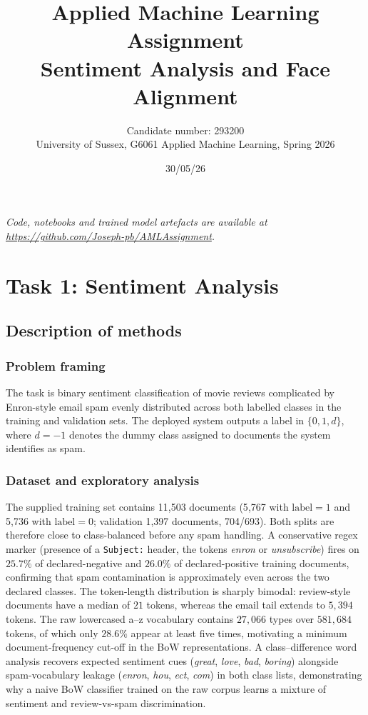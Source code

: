 \documentclass[11pt,a4paper]{article}
\title{%
 Applied Machine Learning Assignment\\[0.4em]
 \large Sentiment Analysis and Face Alignment%
}
\author{%
 Candidate number: 293200\\
 \small University of Sussex, G6061 Applied Machine Learning, Spring 2026%
}
\date{30/05/26}
\begin{document}
\maketitle

\noindent\textit{Code, notebooks and trained model artefacts are available
at \url{https://github.com/Joseph-pb/AMLAssignment}.}


\section{Task 1: Sentiment Analysis}


%

\subsection{Description of methods}
%


\subsubsection{Problem framing}

The task is binary sentiment classification of movie reviews complicated
by Enron-style email spam evenly distributed across both labelled
classes in the training and validation sets. The deployed system outputs
a label in \(\{0, 1, d\}\), where \(d=-1\) denotes the dummy class
assigned to documents the system identifies as spam.

\subsubsection{Dataset and exploratory analysis}

The supplied training set contains 11{,}503 documents (5{,}767 with
\(\textrm{label}=1\) and 5{,}736 with \(\textrm{label}=0\); validation
1{,}397 documents, 704/693). Both splits are therefore close to
class-balanced before any spam handling. A conservative regex marker
(presence of a \texttt{Subject:} header, the tokens \emph{enron} or
\emph{unsubscribe}) fires on \(25.7\%\) of declared-negative and
\(26.0\%\) of declared-positive training documents, confirming that spam
contamination is approximately even across the two declared classes.
The token-length distribution is sharply bimodal: review-style documents
have a median of \(21\) tokens, whereas the email tail extends to
\(5{,}394\) tokens. The raw lowercased a--z vocabulary contains
\(27{,}066\) types over \(581{,}684\) tokens, of which only \(28.6\%\)
appear at least five times, motivating a minimum document-frequency
cut-off in the BoW representations. A class--difference word analysis
recovers expected sentiment cues (\emph{great}, \emph{love}, \emph{bad},
\emph{boring}) alongside spam-vocabulary leakage (\emph{enron},
\emph{hou}, \emph{ect}, \emph{com}) in both class lists, demonstrating
why a naive BoW classifier trained on the raw corpus learns a mixture of
sentiment and review-vs-spam discrimination.
\end{document}
